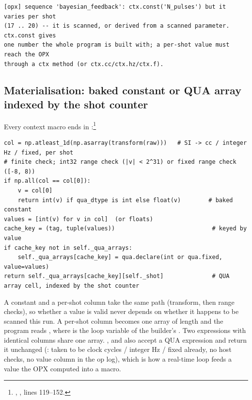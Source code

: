 \begin{lstlisting}[style=txt]
[opx] sequence 'bayesian_feedback': ctx.const('N_pulses') but it varies per shot
(17 .. 20) -- it is scanned, or derived from a scanned parameter. ctx.const gives
one number the whole program is built with; a per-shot value must reach the OPX
through a ctx method (or ctx.cc/ctx.hz/ctx.f).
\end{lstlisting}

\subsection{Materialisation: baked constant or QUA array indexed by the shot counter}
\label{sec:xvars:resolve}

Every context macro ends in :\footnote{,
, lines 119--152.}

\begin{lstlisting}[style=py]
col = np.atleast_1d(np.asarray(transform(raw)))   # SI -> cc / integer Hz / fixed, per shot
# finite check; int32 range check (|v| < 2^31) or fixed range check ([-8, 8))
if np.all(col == col[0]):
    v = col[0]
    return int(v) if qua_dtype is int else float(v)        # baked constant
values = [int(v) for v in col]  (or floats)
cache_key = (tag, tuple(values))                            # keyed by value
if cache_key not in self._qua_arrays:
    self._qua_arrays[cache_key] = qua.declare(int or qua.fixed, value=values)
return self._qua_arrays[cache_key][self._shot]              # QUA array cell, indexed by the shot counter
\end{lstlisting}

A constant and a per-shot column take the same path (transform, then range
checks), so whether a value is valid never depends on whether it happens to
be scanned this run. A per-shot column becomes one  array of length  and the program reads
, where  is the loop variable of the builder's
. Two expressions with
identical columns share one array. ,  and
 also accept a QUA expression and return it unchanged
(: taken to be clock cycles / integer Hz / fixed already,
no host checks, no value column in the op log), which is how a real-time loop
feeds a value the OPX computed into a macro.


